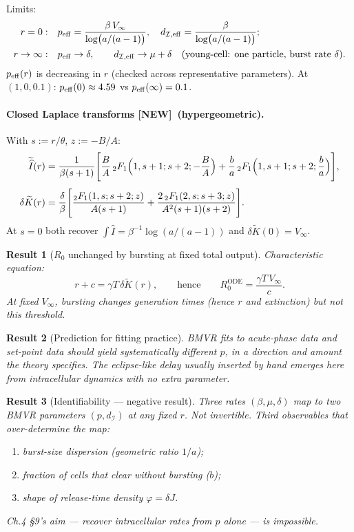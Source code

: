 \documentclass[11pt,a4paper]{article}
\newcommand{\Ihat}{\widehat{I}}
\newcommand{\Icell}{\mathcal{I}}
\newcommand{\Lap}[1]{\widetilde{#1}}
\newcommand{\Fhyp}{{}_2F_1}
\newcommand{\Aa}{A}
\newcommand{\Bb}{B}
\theoremstyle{plain}
\newtheorem{result}{Result}[section]
\theoremstyle{definition}
\theoremstyle{remark}
\newcommand{\NEW}{\textcolor{blue!55!black}{\textbf{[NEW]}}}
\begin{document}
Limits:
\begin{align}
r=0:&\quad
p_{\rm eff}=\frac{\beta\,V_\infty}{\log\bigl(a/(a-1)\bigr)},
\quad
d_{\Icell,{\rm eff}}=\frac{\beta}{\log\bigl(a/(a-1)\bigr)};\\
r\to\infty:&\quad
p_{\rm eff}\to\delta,\qquad
d_{\Icell,{\rm eff}}\to\mu+\delta
\quad\text{(young-cell: one particle, burst rate $\delta$)}.
\end{align}
$p_{\rm eff}(r)$ is decreasing in $r$ (checked across representative parameters).
At $(1,0,0.1)$: $p_{\rm eff}(0)\approx 4.59$ vs $p_{\rm eff}(\infty)=0.1$.

\paragraph{Closed Laplace transforms \NEW\ (hypergeometric).}
With $s:=r/\theta$, $z:=-\Bb/\Aa$:
\begin{align}
\Lap{\Ihat}(r)&=\frac{1}{\beta(s+1)}
\Biggl[
\frac{\Bb}{\Aa}\,\Fhyp\Bigl(1,s+1;s+2;-\frac{\Bb}{\Aa}\Bigr)
+\frac{b}{a}\,\Fhyp\Bigl(1,s+1;s+2;\frac{b}{a}\Bigr)
\Biggr],\\[0.35em]
\delta\Lap{K}(r)&=\frac{\delta}{\beta}
\Biggl[
\frac{\Fhyp(1,s;s+2;z)}{\Aa(s+1)}
+\frac{2\,\Fhyp(2,s;s+3;z)}{\Aa^2(s+1)(s+2)}
\Biggr].
\end{align}
At $s=0$ both recover $\int\Ihat=\beta^{-1}\log(a/(a-1))$ and
$\delta\Lap{K}(0)=V_\infty$.

\begin{result}[$R_0$ unchanged by bursting at fixed total output]
Characteristic equation:
\[
r+c=\gamma T\,\delta\Lap{K}(r),
\qquad\text{hence}\qquad
R_0^{\mathrm{ODE}}=\frac{\gamma T\,V_\infty}{c}.
\]
At fixed $V_\infty$, bursting changes generation times (hence $r$ and
extinction) but not this threshold.
\end{result}

\begin{result}[Prediction for fitting practice]
BMVR fits to acute-phase data and set-point data should yield systematically
different $p$, in a direction and amount the theory specifies. The
eclipse-like delay usually inserted by hand emerges here from intracellular
dynamics with no extra parameter.
\end{result}

\begin{result}[Identifiability --- negative result]
Three rates $(\beta,\mu,\delta)$ map to two BMVR parameters $(p,d_{\Icell})$ at
any fixed $r$. Not invertible. Third observables that over-determine the map:
\begin{enumerate}
\item burst-size dispersion (geometric ratio $1/a$);
\item fraction of cells that clear without bursting ($b$);
\item shape of release-time density $\varphi=\delta J$.
\end{enumerate}
Ch.4 \S9's aim --- recover intracellular rates from $p$ alone --- is impossible.
\end{result}
\end{document}
